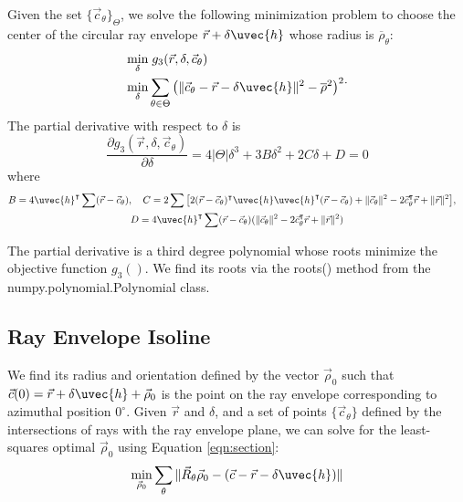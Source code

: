 Given the set $\{\vec{c}_\theta\}_\Theta$, we solve the following minimization problem to choose the center of the circular ray envelope $\vec{r} + \delta \uvec{h}$ whose radius is $\overline{\rho}_\theta$:
\begin{equation}
    \begin{split}
        \min_\delta & \; g_3(\vec{r}, \delta, \vec{c}_\theta) \\
        \min_\delta & \sum_{\theta \in \Theta} \big( \| \vec{c}_\theta - \vec{r} - \delta \uvec{h} \|^2 - \overline{\rho}^2 \big)^2
    \end{split}.
\end{equation}
%
The partial derivative with respect to $\delta$ is
\begin{equation}
    \frac{\partial g_3(\vec{r}, \delta, \vec{c}_\theta)}{\partial \delta} = 4 |\Theta| \delta^3 + 3 B \delta^2 + 2 C \delta + D = 0
\end{equation}
where
\begin{gather}
    B = 4\uvec{h}^\intercal \sum (\vec{r} - \vec{c}_\theta), \quad C = 2\sum \big[2(\vec{r} - \vec{c}_\theta)^\intercal \uvec{h}\uvec{h}^\intercal(\vec{r} - \vec{c}_\theta) + \|\vec{c}_\theta\|^2 - 2\vec{c}^\intercal_\theta \vec{r} + \|\vec{r}\|^2 \big], \quad \\ D = 4\uvec{h}^\intercal \sum (\vec{r} - \vec{c}_\theta)(\|\vec{c}_\theta\|^2 - 2\vec{c}^\intercal_\theta \vec{r} + \|\vec{r}\|^2)
\end{gather}

The partial derivative is a third degree polynomial whose roots minimize the objective function $g_3()$. We find its roots via the roots() method from the numpy.polynomial.Polynomial class.

\subsection{Ray Envelope Isoline}
We find its radius and orientation defined by the vector $\vec{\rho}_0$ such that $\vec{c}(0) = \vec{r} + \delta \uvec{h} + \vec{\rho}_0$ is the point on the ray envelope corresponding to azimuthal position $0^\circ$. Given $\vec{r}$ and $\delta$, and a set of points $\{\vec{c}_\theta\}$ defined by the intersections of rays with the ray envelope plane, we can solve for the least-squares optimal $\vec{\rho}_0$ using Equation \ref{eqn:section}:
%
\begin{equation}
    \min_{\vec{\rho}_0} \sum_{\theta} \| \vec{R}_\theta \vec{\rho}_0 - (\vec{c} - \vec{r} - \delta \uvec{h}) \|
\end{equation}
%

